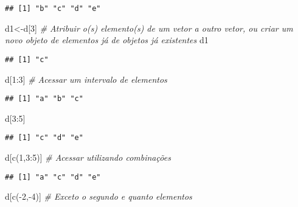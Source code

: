 \documentclass[
]{book}
\newenvironment{Shaded}{\begin{snugshade}}{\end{snugshade}}
\newcommand{\CommentTok}[1]{\textcolor[rgb]{0.56,0.35,0.01}{\textit{#1}}}
\newcommand{\DecValTok}[1]{\textcolor[rgb]{0.00,0.00,0.81}{#1}}
\newcommand{\FunctionTok}[1]{\textcolor[rgb]{0.00,0.00,0.00}{#1}}
\newcommand{\NormalTok}[1]{#1}
\newcommand{\OtherTok}[1]{\textcolor[rgb]{0.56,0.35,0.01}{#1}}
\newcommand{\SpecialCharTok}[1]{\textcolor[rgb]{0.00,0.00,0.00}{#1}}
\begin{document}
\begin{verbatim}
## [1] "b" "c" "d" "e"
\end{verbatim}

\begin{Shaded}
\begin{Highlighting}[]
\NormalTok{d1}\OtherTok{\textless{}{-}}\NormalTok{d[}\DecValTok{3}\NormalTok{] }\CommentTok{\# Atribuir o(s) elemento(s) de um vetor a outro vetor, ou criar um novo objeto de elementos já de objetos já existentes}
\NormalTok{d1}
\end{Highlighting}
\end{Shaded}

\begin{verbatim}
## [1] "c"
\end{verbatim}

\begin{Shaded}
\begin{Highlighting}[]
\NormalTok{d[}\DecValTok{1}\SpecialCharTok{:}\DecValTok{3}\NormalTok{] }\CommentTok{\# Acessar um intervalo de elementos}
\end{Highlighting}
\end{Shaded}

\begin{verbatim}
## [1] "a" "b" "c"
\end{verbatim}

\begin{Shaded}
\begin{Highlighting}[]
\NormalTok{d[}\DecValTok{3}\SpecialCharTok{:}\DecValTok{5}\NormalTok{]}
\end{Highlighting}
\end{Shaded}

\begin{verbatim}
## [1] "c" "d" "e"
\end{verbatim}

\begin{Shaded}
\begin{Highlighting}[]
\NormalTok{d[}\FunctionTok{c}\NormalTok{(}\DecValTok{1}\NormalTok{,}\DecValTok{3}\SpecialCharTok{:}\DecValTok{5}\NormalTok{)] }\CommentTok{\# Acessar utilizando combinações}
\end{Highlighting}
\end{Shaded}

\begin{verbatim}
## [1] "a" "c" "d" "e"
\end{verbatim}

\begin{Shaded}
\begin{Highlighting}[]
\NormalTok{d[}\FunctionTok{c}\NormalTok{(}\SpecialCharTok{{-}}\DecValTok{2}\NormalTok{,}\SpecialCharTok{{-}}\DecValTok{4}\NormalTok{)] }\CommentTok{\# Exceto o segundo e quanto elementos}
\end{Highlighting}
\end{Shaded}
\end{document}
